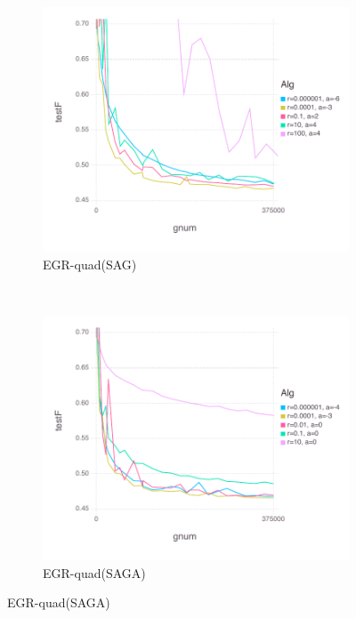 \documentclass[11pt]{article}
\begin{document}
\begin{figure}[H]
   	    \begin{subfigure}[b]{0.45\textwidth}
              \includegraphics[width=\textwidth]{Figures/alphaGoodBLtrueffFinal-quadfalse.pdf}
              \caption{EGR-quad(SAG)}
          \end{subfigure}
          ~ %
          \begin{subfigure}[b]{0.45\textwidth}
              \includegraphics[width=\textwidth]{Figures/alphaGoodBLtrueffFinal-quadtrue.pdf}
              \caption{EGR-quad(SAGA)}
          \end{subfigure}
	   

\end{figure}
\end{document}
